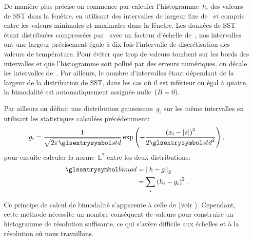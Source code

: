 De manière plus précise on commence par calculer l'histogramme~\(h_i\) des valeurs de SST dans la fenêtre, en utilisant des intervalles de largeur fixe de~ et compris entre les valeurs minimales et maximales dans la fênetre.
Les données de SST étant distribuées compressées par \footnotemark\ avec un facteur d'échelle de~, nos intervalles ont une largeur précisement égale à dix fois l'intervalle de discrétisation des valeurs de température.
Pour éviter que trop de valeurs tombent sur les bords des intervalles et que l'histogramme soit pollué par des erreurs numériques, on décale les intervalles de~.
Par ailleurs, le nombre d'intervalles étant dépendant de la largeur de la distribution de SST, dans les cas où il est inférieur ou égal à quatre, la bimodalité est automatiquement assignée nulle~(\(B=0\)).

Par ailleurs on définit une distribution gaussienne~\(g_i\) sur les même intervalles en utilisant les statistiques calculées précédemment:
\begin{equation}
  g_i = \frac{1}{\sqrt{2\pi\am{std}}} \exp\paren{-\frac{\paren{x_i-\moy{s}}^2}{2\am{std}^2}},
\end{equation}
pour ensuite calculer la norme~\(\mathbb{L}^2\) entre les deux distributions:
\begin{equation}
  \begin{split}
  \am{bimod} & = \norme[2]{h - g}\\
             & = \sum_i \paren{h_i - g_i}^2 .
  \end{split}
\end{equation}

Ce principe de calcul de bimodalité s'apparente à celle de \textcite{cayula_1992} (voir ).
Cependant, cette méthode nécessite un nombre conséquent de valeurs pour construire un histogramme de résolution suffisante, ce qui s'avère difficile aux échelles et à la résolution où nous travaillons.


